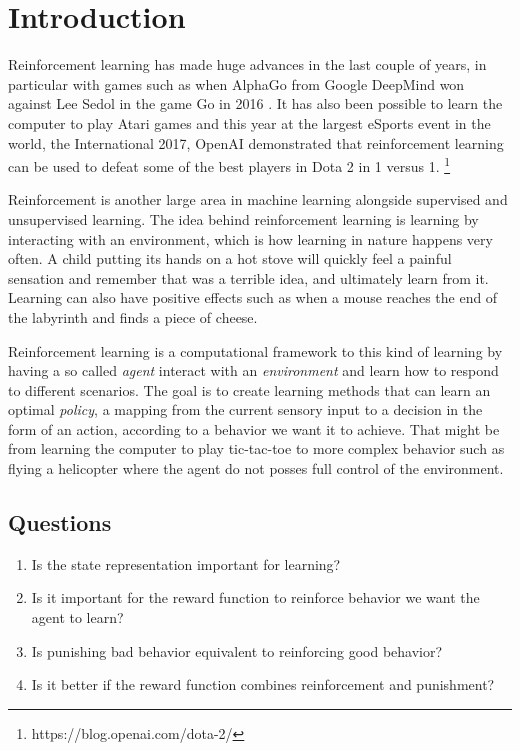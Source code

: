\documentclass[report.tex]{subfiles}
\begin{document}
    \section*{\centering Introduction}

    Reinforcement learning has made huge advances in the last couple of years, in particular with games such as when AlphaGo from Google DeepMind won against Lee Sedol in the game Go in 2016 \cite{silver2016mastering}. It has also been possible to learn the computer to play Atari games \cite{mnih2013playing} and this year at the largest eSports event in the world, the International 2017, OpenAI demonstrated that reinforcement learning can be used to defeat some of the best players in Dota 2 in 1 versus 1. \footnote{https://blog.openai.com/dota-2/}

    Reinforcement is another large area in machine learning alongside supervised and unsupervised learning. The idea behind reinforcement learning is learning by interacting with an environment, which is how learning in nature happens very often. A child putting its hands on a hot stove will quickly feel a painful sensation and remember that was a terrible idea, and ultimately learn from it. Learning can also have positive effects such as when a mouse reaches the end of the labyrinth and finds a piece of cheese.

    Reinforcement learning is a computational framework to this kind of learning by having a so called \textit{agent} interact with an \textit{environment} and learn how to respond to different scenarios. The goal is to create learning methods that can learn an optimal \textit{policy}, a mapping from the current sensory input to a decision in the form of an action, according to a behavior we want it to achieve. That might be from learning the computer to play tic-tac-toe to more complex behavior such as flying a helicopter where the agent do not posses full control of the environment.

    \subsection*{Questions}

    \begin{enumerate}
        \item Is the state representation important for learning?
        \item Is it important for the reward function to reinforce behavior we want the agent to learn?
        \item Is punishing bad behavior equivalent to reinforcing good behavior?
        \item Is it better if the reward function combines reinforcement and punishment?
    \end{enumerate}
\end{document}
